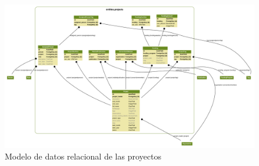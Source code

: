 \begin{figure}[!htbp]
	\centering
	\includegraphics[angle=90, scale=0.35]{fig/dbmodel/projects}
	\caption{Modelo de datos relacional de las proyectos}
	\label{fig:projectsmodel}
\end{figure}
